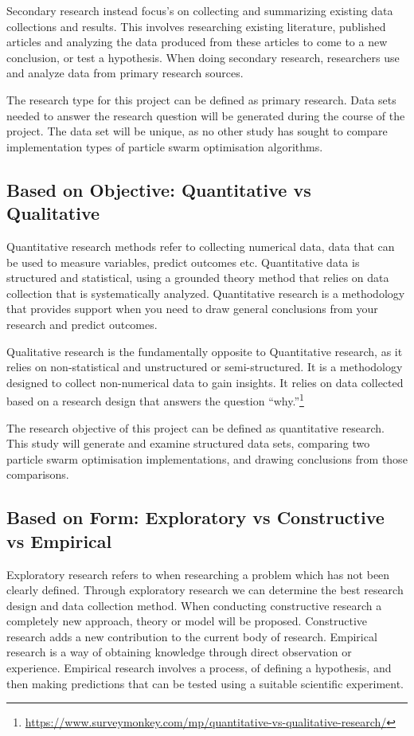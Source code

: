 \documentclass[oneside,12pt]{book}
\begin{document}
Secondary research instead focus's on collecting and summarizing existing data collections and results. This involves researching existing literature, published articles and analyzing the data produced from these articles to come to a new conclusion, or test a hypothesis. When doing secondary research, researchers use and analyze data from primary research sources.\cite{bouchrika_2020}

The research type for this project can be defined as primary research. Data sets needed to answer the research question will be generated during the course of the project. The data set will be unique, as no other study has sought to compare implementation types of particle swarm optimisation algorithms. 
\subsection{Based on Objective: Quantitative vs Qualitative}
Quantitative research methods refer to collecting numerical data, data that can be used to measure variables, predict outcomes etc. Quantitative data is structured and statistical, using a grounded theory method that relies on data collection that is systematically analyzed. Quantitative research is a methodology that provides support when you need to draw general conclusions from your research and predict outcomes.\cite{mcleod_2019}

Qualitative research is the fundamentally opposite to Quantitative research, as it relies on non-statistical and unstructured or semi-structured. It is a methodology designed to collect non-numerical data to gain insights. It relies on data collected based on a research design that answers the question “why.”\footnote{\url{https://www.surveymonkey.com/mp/quantitative-vs-qualitative-research/}}

The research objective of this project can be defined as quantitative research. This study will generate and examine structured data sets, comparing two particle swarm optimisation implementations, and drawing conclusions from those comparisons. 
\subsection{Based on Form: Exploratory vs Constructive vs Empirical}
Exploratory research refers to when researching a problem which has not been clearly defined. Through exploratory research we can determine the best research design and data collection method. 
When conducting constructive research a completely new approach, theory or model will be proposed. Constructive research adds a new contribution to the current body of research. 
Empirical research is a way of obtaining knowledge through direct observation or experience. Empirical research involves a process, of defining a hypothesis, and then making predictions that can be tested using a suitable scientific experiment. 
\end{document}
